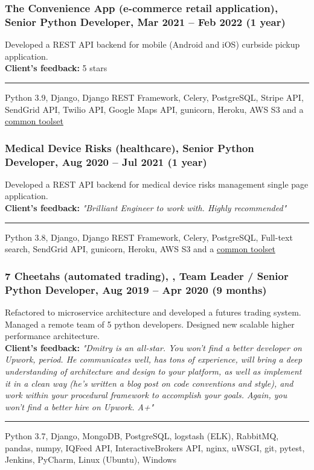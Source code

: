\documentclass[a4paper,8pt]{extarticle}
\newcommand{\chref}[2]{\href{#1}{\underline{\smash{#2}}}}  %
\newcommand{\itchref}[2]{\chref{#1}{\textit{#2}}}  %
\newcommand{\chrule}{\vspace{3pt}\hrule}
\begin{document}
\subsubsection*{The Convenience App (e-commerce retail application), Senior Python Developer, Mar 2021 -- Feb 2022 (1 year)}
Developed a REST API backend for mobile (Android and iOS) curbside pickup application.\\
\textbf{Client's feedback:} 5 stars
\chrule
Python 3.9, Django, Django REST Framework, Celery, PostgreSQL, Stripe API, SendGrid API, Twilio API, Google Maps API, gunicorn, Heroku, AWS S3 and a \hyperlink{common-toolset}{common toolset}

\subsubsection*{Medical Device Risks (healthcare), Senior Python Developer, Aug 2020 -- Jul 2021 (1 year)}
Developed a REST API backend for medical device risks management single page application.\\
\textbf{Client's feedback:} \textit{"Brilliant Engineer to work with. Highly recommended"}
\chrule
Python 3.8, Django, Django REST Framework, Celery, PostgreSQL, Full-text search, SendGrid API, gunicorn, Heroku, AWS S3 and a \hyperlink{common-toolset}{common toolset}

\pagebreak

\subsubsection*{7 Cheetahs (automated trading), \itchref{https://7cheetahs.com}{7cheetahs.com}, Team Leader / Senior Python Developer, Aug 2019 -- Apr 2020 (9 months)}
Refactored to microservice architecture and developed a futures trading system. Managed a remote team of 5 python developers. Designed new scalable higher performance architecture.\\
\textbf{Client's feedback:} \textit{"Dmitry is an all-star. You won't find a better developer on Upwork, period. He communicates well, has tons of experience, will bring a deep understanding of architecture and design to your platform, as well as implement it in a clean way (he's written a blog post on code conventions and style), and work within your procedural framework to accomplish your goals. Again, you won't find a better hire on Upwork. A+"}
\chrule
Python 3.7, Django, MongoDB, PostgreSQL, logstash (ELK), RabbitMQ, pandas, numpy, IQFeed API, InteractiveBrokers API, nginx, uWSGI, git, pytest, Jenkins, PyCharm, Linux (Ubuntu), Windows
\end{document}
